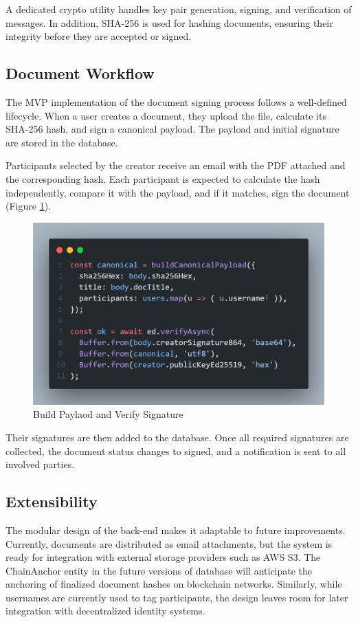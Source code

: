A dedicated crypto utility handles key pair generation, signing, and verification of messages. In addition, SHA-256 is used for hashing documents, ensuring their integrity before they are accepted or signed.

\subsection{Document Workflow}
The MVP implementation of the document signing process follows a well-defined lifecycle. When a user creates a document, they upload the file, calculate its SHA-256 hash, and sign a canonical payload. The payload and initial signature are stored in the database.

Participants selected by the creator receive an email with the PDF attached and the corresponding hash. Each participant is expected to calculate the hash independently, compare it with the payload, and if it matches, sign the document (Figure \ref{payload-signature}). 

\begin{figure}[H]
    \centering
    \includegraphics[width=18cm]{"images/payload-signature.png"}
    \caption{Build Paylaod and Verify Signature}
    \label{payload-signature}
\end{figure}

Their signatures are then added to the database. Once all required signatures are collected, the document status changes to signed, and a notification is sent to all involved parties.

\subsection{Extensibility}
The modular design of the back-end makes it adaptable to future improvements. Currently, documents are distributed as email attachments, but the system is ready for integration with external storage providers such as AWS S3. The ChainAnchor entity in the future versions of database will anticipate the anchoring of finalized document hashes on blockchain networks. Similarly, while usernames are currently used to tag participants, the design leaves room for later integration with decentralized identity systems.

